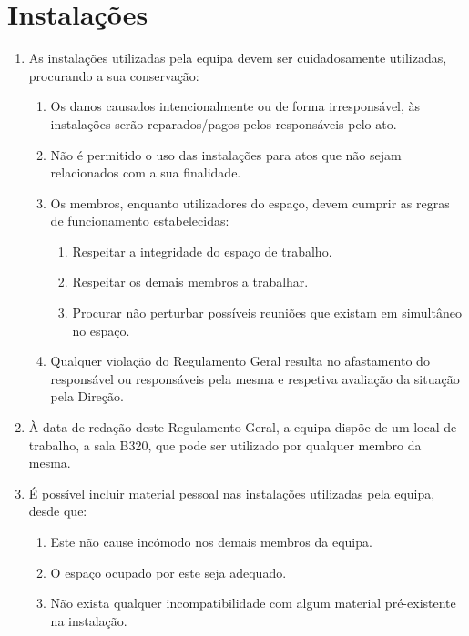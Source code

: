 \section{Instalações}
\begin{enumerate}
  \item As instalações utilizadas pela equipa devem ser cuidadosamente utilizadas, procurando a sua conservação:
  \begin{enumerate}
    \item Os danos causados intencionalmente ou de forma irresponsável, às instalações serão reparados/pagos pelos responsáveis pelo ato.
    \item Não é permitido o uso das instalações para atos que não sejam relacionados com a sua finalidade.
    \item Os membros, enquanto utilizadores do espaço, devem cumprir as regras de funcionamento estabelecidas:
    \begin{enumerate}
      \item Respeitar a integridade do espaço de trabalho.
      \item Respeitar os demais membros a trabalhar.
      \item Procurar não perturbar possíveis reuniões que existam em simultâneo no espaço.
    \end{enumerate}
    \item Qualquer violação do Regulamento Geral resulta no afastamento do responsável ou responsáveis pela mesma e respetiva avaliação da situação pela Direção.
  \end{enumerate}
  \item À data de redação deste Regulamento Geral, a equipa dispõe de um local de trabalho, a sala B320, que pode ser utilizado por qualquer membro da mesma.
  \item É possível incluir material pessoal nas instalações utilizadas pela equipa, desde que:
  \begin{enumerate}
    \item Este não cause incómodo nos demais membros da equipa.
    \item O espaço ocupado por este seja adequado.
    \item Não exista qualquer incompatibilidade com algum material pré-existente na instalação.
  \end{enumerate}
\end{enumerate}

